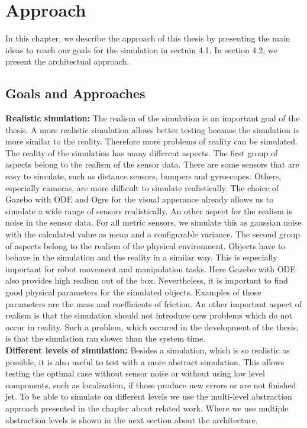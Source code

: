 \chapter{Approach}
In this chapter, we describe the approach of this thesis by presenting the main ideas to reach our goals for the simulation in sectuin 4.1. In section 4.2, we present the architectual approach.

\section{Goals and Approaches}
\textbf{Realistic simulation:} The realism of the simulation is an important goal of the thesis. A more realistic simulation allows better testing because the simulation is more similar to the reality. Therefore more problems of reality can be simulated. The reality of the simulation has many different aspects. The first group of aspects belong to the realism of the sensor data. There are some sensors that are easy to simulate, such as distance sensors, bumpers and gyroscopes. Others, especially cameras, are more difficult to simulate realistically. The choice of Gazebo with ODE and Ogre for the visual apperance already allows us to simulate a wide range of sensors realistically. An other aspect for the realism is noise in the sensor data. For all metric sensors, we simulate this as gaussian noise with the calculated value as mean and a configurable variance. The second group of aspects belong to the realism of the physical environment. Objects have to behave in the simulation and the reality in a similar way. This is especially important for robot movement and manipulation tasks. Here Gazebo with ODE also provides high realism out of the box. Nevertheless, it is important to find good physical parameters for the simulated objects. Examples of those parameters are the mass and coefficients of friction. An other important aspect of realism is that the simulation should not introduce new problems which do not occur in reality. Such a problem, which occured in the development of the thesis, is that the simulation ran slower than the system time.\\
\textbf{Different levels of simulation:} Besides a simulation, which is so realistic as possible, it is also useful to test with a more abstract simulation. This allows testing the optimal case without sensor noise or without using low level components, such as localization, if those produce new errors or are not finished jet. To be able to simulate on different levels we use the multi-level abstraction approach presented in the chapter about related work. Where we use multiple abstraction levels is shown in the next section about the architecture.\\
